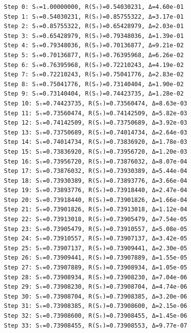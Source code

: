 \documentclass[11pt]{article}
\makeatletter
\newcommand{\boxspacing}{\kern\kvtcb@left@rule\kern\kvtcb@boxsep}
\newcommand{\prompt}[4]{
        {\ttfamily\llap{{\color{#2}[#3]:\hspace{3pt}#4}}\vspace{-\baselineskip}}
    }
\makeatother
\begin{document}
    \begin{Verbatim}[commandchars=\\\{\}]
Step 0: Sₜ=1.00000000, R(Sₜ)=0.54030231, Δ=4.60e-01
Step 1: Sₜ=0.54030231, R(Sₜ)=0.85755322, Δ=3.17e-01
Step 2: Sₜ=0.85755322, R(Sₜ)=0.65428979, Δ=2.03e-01
Step 3: Sₜ=0.65428979, R(Sₜ)=0.79348036, Δ=1.39e-01
Step 4: Sₜ=0.79348036, R(Sₜ)=0.70136877, Δ=9.21e-02
Step 5: Sₜ=0.70136877, R(Sₜ)=0.76395968, Δ=6.26e-02
Step 6: Sₜ=0.76395968, R(Sₜ)=0.72210243, Δ=4.19e-02
Step 7: Sₜ=0.72210243, R(Sₜ)=0.75041776, Δ=2.83e-02
Step 8: Sₜ=0.75041776, R(Sₜ)=0.73140404, Δ=1.90e-02
Step 9: Sₜ=0.73140404, R(Sₜ)=0.74423735, Δ=1.28e-02
Step 10: Sₜ=0.74423735, R(Sₜ)=0.73560474, Δ=8.63e-03
Step 11: Sₜ=0.73560474, R(Sₜ)=0.74142509, Δ=5.82e-03
Step 12: Sₜ=0.74142509, R(Sₜ)=0.73750689, Δ=3.92e-03
Step 13: Sₜ=0.73750689, R(Sₜ)=0.74014734, Δ=2.64e-03
Step 14: Sₜ=0.74014734, R(Sₜ)=0.73836920, Δ=1.78e-03
Step 15: Sₜ=0.73836920, R(Sₜ)=0.73956720, Δ=1.20e-03
Step 16: Sₜ=0.73956720, R(Sₜ)=0.73876032, Δ=8.07e-04
Step 17: Sₜ=0.73876032, R(Sₜ)=0.73930389, Δ=5.44e-04
Step 18: Sₜ=0.73930389, R(Sₜ)=0.73893776, Δ=3.66e-04
Step 19: Sₜ=0.73893776, R(Sₜ)=0.73918440, Δ=2.47e-04
Step 20: Sₜ=0.73918440, R(Sₜ)=0.73901826, Δ=1.66e-04
Step 21: Sₜ=0.73901826, R(Sₜ)=0.73913018, Δ=1.12e-04
Step 22: Sₜ=0.73913018, R(Sₜ)=0.73905479, Δ=7.54e-05
Step 23: Sₜ=0.73905479, R(Sₜ)=0.73910557, Δ=5.08e-05
Step 24: Sₜ=0.73910557, R(Sₜ)=0.73907137, Δ=3.42e-05
Step 25: Sₜ=0.73907137, R(Sₜ)=0.73909441, Δ=2.30e-05
Step 26: Sₜ=0.73909441, R(Sₜ)=0.73907889, Δ=1.55e-05
Step 27: Sₜ=0.73907889, R(Sₜ)=0.73908934, Δ=1.05e-05
Step 28: Sₜ=0.73908934, R(Sₜ)=0.73908230, Δ=7.04e-06
Step 29: Sₜ=0.73908230, R(Sₜ)=0.73908704, Δ=4.74e-06
Step 30: Sₜ=0.73908704, R(Sₜ)=0.73908385, Δ=3.20e-06
Step 31: Sₜ=0.73908385, R(Sₜ)=0.73908600, Δ=2.15e-06
Step 32: Sₜ=0.73908600, R(Sₜ)=0.73908455, Δ=1.45e-06
Step 33: Sₜ=0.73908455, R(Sₜ)=0.73908553, Δ=9.77e-07
    \end{Verbatim}

    \begin{center}
    \end{center}
    { \hspace*{\fill} \\}
    
    \begin{tcolorbox}[breakable, size=fbox, boxrule=1pt, pad at break*=1mm,colback=cellbackground, colframe=cellborder]
\prompt{In}{incolor}{ }{\boxspacing}
\begin{Verbatim}[commandchars=\\\{\}]

\end{Verbatim}
\end{tcolorbox}
\end{document}
